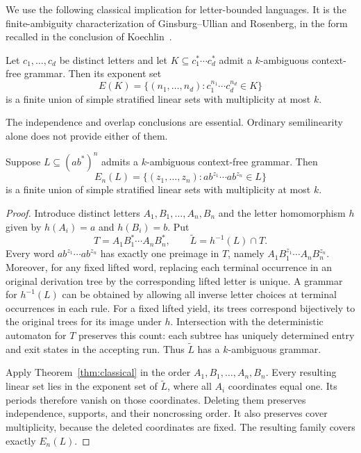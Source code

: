 \documentclass[a4paper,USenglish,cleveref,autoref]{lipics-v2021}
\begin{document}
We use the following classical implication for letter-bounded languages.
It is the finite-ambiguity characterization of Ginsburg--Ullian and Rosenberg, in the form recalled in the conclusion of Koechlin~\cite{GinsburgUllian1966,Rosenberg1970,Koechlin2022}.
\begin{theorem}\label{thm:classical}
Let $c_1,\ldots,c_d$ be distinct letters and let $K\subseteq c_1^*\cdots c_d^*$ admit a $k$-ambiguous context-free grammar.
Then its exponent set
\[
 E(K)=\{(n_1,\ldots,n_d):c_1^{n_1}\cdots c_d^{n_d}\in K\}
\]
is a finite union of simple stratified linear sets with multiplicity at most $k$.
\end{theorem}
The independence and overlap conclusions are essential.
Ordinary semilinearity alone does not provide either of them.

\begin{lemma}\label{lem:lift}
Suppose $L\subseteq (ab^*)^n$ admits a $k$-ambiguous context-free grammar.
Then
\[
 E_n(L)=\{(z_1,\ldots,z_n):ab^{z_1}\cdots ab^{z_n}\in L\}
\]
is a finite union of simple stratified linear sets with multiplicity at most $k$.
\end{lemma}
\begin{proof}
Introduce distinct letters $A_1,B_1,\ldots,A_n,B_n$ and the letter homomorphism $h$ given by $h(A_i)=a$ and $h(B_i)=b$.
Put
\[
 T=A_1B_1^*\cdots A_nB_n^*,\qquad \widetilde L=h^{-1}(L)\cap T.
\]
Every word $ab^{z_1}\cdots ab^{z_n}$ has exactly one preimage in $T$, namely $A_1B_1^{z_1}\cdots A_nB_n^{z_n}$.
Moreover, for any fixed lifted word, replacing each terminal occurrence in an original derivation tree by the corresponding lifted letter is unique.
A grammar for $h^{-1}(L)$ can be obtained by allowing all inverse letter choices at terminal occurrences in each rule.
For a fixed lifted yield, its trees correspond bijectively to the original trees for its image under $h$.
Intersection with the deterministic automaton for $T$ preserves this count: each subtree has uniquely determined entry and exit states in the accepting run.
Thus $\widetilde L$ has a $k$-ambiguous grammar.

Apply Theorem~\ref{thm:classical} in the order $A_1,B_1,\ldots,A_n,B_n$.
Every resulting linear set lies in the exponent set of $\widetilde L$, where all $A_i$ coordinates equal one.
Its periods therefore vanish on those coordinates.
Deleting them preserves independence, supports, and their noncrossing order.
It also preserves cover multiplicity, because the deleted coordinates are fixed.
The resulting family covers exactly $E_n(L)$.
\end{proof}
\end{document}
